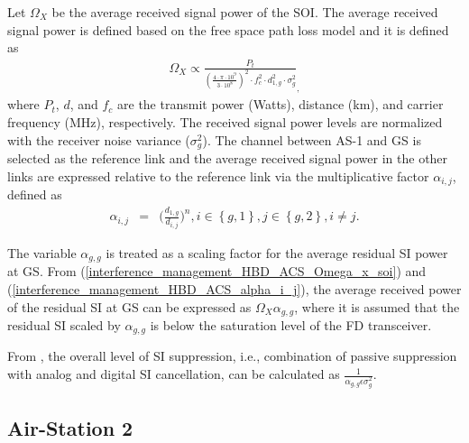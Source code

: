 Let $\Omega_{X}$ be the average received signal power of the SOI. The average received signal power is defined based on the free space path loss model \cite[Eq. (2.7)]{goldsmith2005wireless} and it is defined as
\begin{eqnarray} \label{interference_management_HBD_ACS_Omega_x_soi}
\Omega_{X} \propto \frac{P_t}{{\left(\frac{4\cdot\pi\cdot{10^9}}{3\cdot10^8}\right)^2}{\cdot}f_{c}^2{\cdot}d_{1,g}^{2}{\cdot}\sigma_g^2}_,
\end{eqnarray}
where $P_{t}$, $d$, and $f_{c}$ are the transmit power (Watts), distance (km), and carrier frequency (MHz), respectively. The received signal power levels are normalized with the receiver noise variance ($\sigma_g^2$). The channel between AS-1 and GS is selected as the reference link and the average received signal power in the other links are expressed relative to the reference link via the multiplicative factor $\alpha_{i,j}$,  defined as
\begin{eqnarray} \label{interference_management_HBD_ACS_alpha_i_j}
\alpha_{i,j} & = & \bigg(\frac{d_{1,g}}{d_{i,j}}\bigg)^n, i\in\left\{g,1\right\}, j\in\left\{g,2\right\}, i \neq j.
\end{eqnarray}

The variable $\alpha_{g,g}$ is treated as a scaling factor for the average residual SI power at GS. From (\ref{interference_management_HBD_ACS_Omega_x_soi}) and (\ref{interference_management_HBD_ACS_alpha_i_j}), the average received power of the residual SI at GS can be expressed as $\Omega_X\alpha_{g,g}$, where it is assumed that the residual SI scaled by $\alpha_{g,g}$ is below the saturation level of the FD transceiver.

From \cite{zlatanov2017capacity}, the overall level of SI suppression, i.e., combination of passive suppression with analog and digital SI cancellation, can be calculated as $\frac{1}{\alpha_{g,g}\epsilon\sigma_g^2}$.

\subsection{Air-Station 2}

